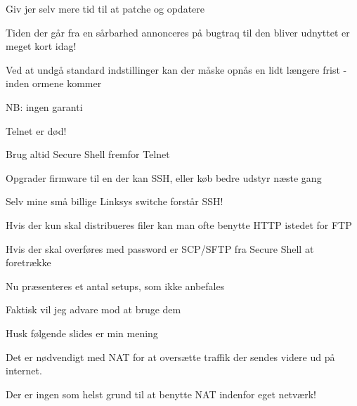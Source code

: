 \documentclass[Screen16to9,17pt]{foils}
\begin{document}

\begin{list1}
\item Giv jer selv mere tid til at patche og opdatere
\item Tiden der går fra en sårbarhed annonceres på bugtraq til den bliver
       udnyttet er meget kort idag!
\item Ved at undgå standard indstillinger kan der
       måske opnås en lidt længere frist - inden ormene kommer
\item NB: ingen garanti
\end{list1}




\begin{list1}
\item Telnet er død!
\item Brug altid Secure Shell fremfor Telnet
\item Opgrader firmware til en der kan SSH, eller køb bedre udstyr næste gang
\item Selv mine små billige Linksys switche forstår SSH!
\end{list1}


\begin{list1}
\item Hvis der kun skal distribueres filer kan man ofte benytte HTTP istedet for FTP
\item Hvis der skal overføres med password er SCP/SFTP fra Secure Shell at foretrække
\end{list1}



\begin{list1}
\item Nu præsenteres et antal setups, som ikke anbefales
\item Faktisk vil jeg advare mod at bruge dem
\item Husk følgende slides er min mening
\end{list1}



\begin{list1}
\item Det er nødvendigt med NAT for at oversætte traffik der sendes videre
ud på internet.
\item Der er ingen som helst grund til at benytte NAT indenfor eget netværk!
\end{list1}
\end{document}
